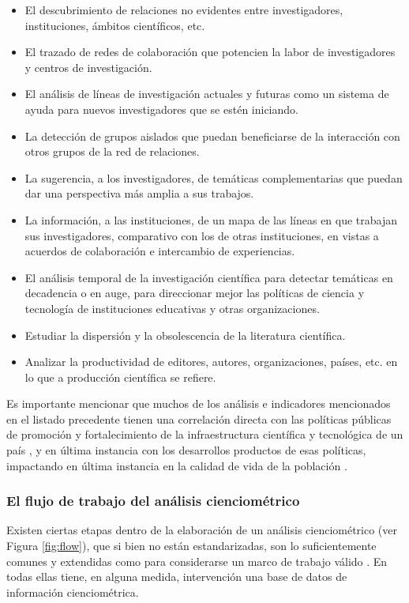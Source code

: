 \begin{itemize}
	\item El descubrimiento de relaciones no evidentes entre investigadores, instituciones, ámbitos científicos, etc.
	\item El trazado de redes de colaboración que potencien la labor de investigadores y centros de investigación.
	\item El análisis de líneas de investigación actuales y futuras como un sistema de ayuda para nuevos investigadores que se estén iniciando.
	\item La detección de grupos aislados que puedan beneficiarse de la interacción con otros grupos de la red de relaciones.
	\item La sugerencia, a los investigadores, de temáticas complementarias que puedan dar una perspectiva más amplia a sus trabajos.
	\item La información, a las instituciones, de un mapa de las líneas en que trabajan sus investigadores, comparativo con los de otras instituciones, en vistas a acuerdos de colaboración e intercambio de experiencias.
	\item El análisis temporal de la investigación científica para detectar temáticas en decadencia o en auge, para direccionar mejor las políticas de ciencia y tecnología de instituciones educativas y otras organizaciones.
	\item Estudiar la dispersión y la obsolescencia de la literatura científica.
	\item Analizar la productividad de editores, autores, organizaciones, países, etc. en lo que a producción científica se refiere.
\end{itemize}

Es importante mencionar que muchos de los análisis e indicadores mencionados \cite{spinak1998indicadores} en el listado precedente tienen una correlación directa con las políticas públicas de promoción y fortalecimiento de la infraestructura científica y tecnológica de un país \cite{de1999science}, y en última instancia con los desarrollos productos de esas políticas, impactando en última instancia en la calidad de vida de la población \cite{miguel2008aproximacion}.

\subsubsection{El flujo de trabajo del análisis cienciométrico}

Existen ciertas etapas dentro de la elaboración de un análisis cienciométrico (ver Figura \ref{fig:flow}), que si bien no están estandarizadas, son lo suficientemente comunes y extendidas como para considerarse un marco de trabajo válido \cite{cardona2017analisis}. En todas ellas tiene, en alguna medida, intervención una base de datos de información cienciométrica.

